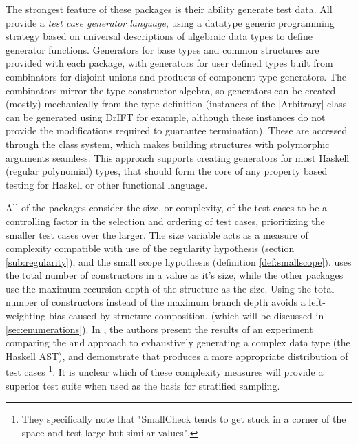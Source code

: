 The strongest feature of these packages is their ability generate test data.
All provide a \emph{test case generator language}, 
using a datatype generic programming strategy based on 
universal descriptions of algebraic data types
to define generator functions.
Generators for base types and common structures are provided with each package,
with generators for user defined types built from 
combinators for disjoint unions and products of component type generators.
The combinators mirror the type constructor algebra,
so generators can be created (mostly) mechanically from the type definition
(instances of the \QC |Arbitrary| class can be generated using DrIFT for example,
although these instances do not provide the 
modifications required to guarantee termination).
These are accessed through the class system,
which makes building structures with polymorphic arguments seamless.
This approach supports creating generators for most Haskell (regular polynomial) types,
that should form the core of any property based testing for Haskell or other functional language.

All of the packages consider the size, or complexity,
of the test cases to be a controlling factor in
the selection and ordering of test cases,
prioritizing the smaller test cases over the larger.
The size variable acts as a measure of complexity
compatible with use of the regularity hypothesis (section \ref{sub:regularity}),
and the small scope hypothesis (definition \ref{def:smallscope}).
\FEAT uses the total number of constructors in a value as it's size,
while the other packages use the maximum recursion depth of the structure as the size.
Using the total number of constructors instead of the maximum branch depth
avoids a left-weighting bias caused by structure composition,
(which will be discussed in \ref{sec:enumerations}).
In \cite{Duregard2012}, the authors present the results of an experiment
comparing the \SC and \FEAT approach to 
exhaustively generating a complex data type (the Haskell AST),
and demonstrate that \FEAT produces a more appropriate distribution of test cases
\footnote{They specifically note that 
"SmallCheck tends to get stuck in a corner of the space and test large but similar values".}.
It is unclear which of these complexity measures will provide a superior test suite
when used as the basis for stratified sampling.

